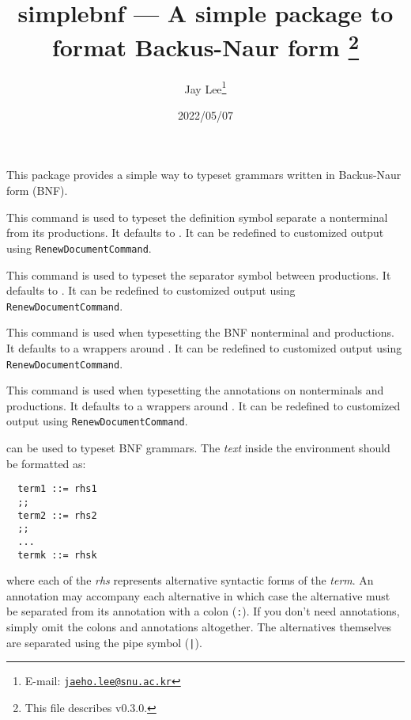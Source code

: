 \documentclass[a4paper]{article}
\title{%
  \textsf{simplebnf} --- A simple package to format Backus-Naur form%
  \footnote{This file describes v0.3.0.}}
\author{Jay Lee\footnote{E-mail: %
  \href{mailto:jaeho.lee@snu.ac.kr}{\texttt{jaeho.lee@snu.ac.kr}}}}
\date{2022/05/07}
\begin{document}
\maketitle

This package provides a simple way to typeset grammars written in Backus-Naur form (BNF).

\begin{presentcommand}
\end{presentcommand}
This command is used to typeset the definition symbol separate a nonterminal from its productions. It defaults to \SimpleBNFDefEq. It can be redefined to customized output using \verb|RenewDocumentCommand|.

\begin{presentcommand}
\end{presentcommand}
This command is used to typeset the separator symbol between productions. It defaults to \SimpleBNFDefOr. It can be redefined to customized output using \verb|RenewDocumentCommand|.

\begin{presentcommand}
\end{presentcommand}
This command is used when typesetting the BNF nonterminal and productions. It defaults to a wrappers around . It can be redefined to customized output using \verb|RenewDocumentCommand|.

\begin{presentcommand}
\end{presentcommand}
This command is used when typesetting the annotations on nonterminals and productions. It defaults to a wrappers around . It can be redefined to customized output using \verb|RenewDocumentCommand|.

\begin{presentcommand}
\end{presentcommand}
can be used to typeset BNF grammars. The \textit{text} inside the environment should be formatted as:
\begin{verbatim}
  term1 ::= rhs1
  ;;
  term2 ::= rhs2
  ;;
  ...
  termk ::= rhsk
\end{verbatim}
where each of the \textit{rhs} represents alternative syntactic forms of the \textit{term}. An annotation may accompany each alternative in which case the alternative must be separated from its annotation with a colon (\verb/:/). If you don't need annotations, simply omit the colons and annotations altogether. The alternatives themselves are separated using the pipe symbol (\verb/|/).
\end{document}
